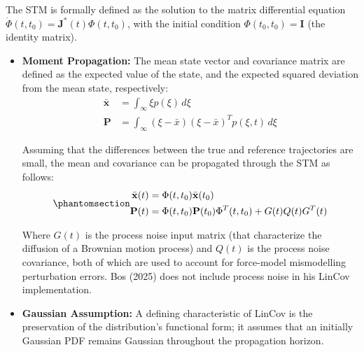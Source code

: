\documentclass[
  letterpaper,
  DIV=11,
  numbers=noendperiod,
  oneside]{scrartcl}
\begin{document}
\begin{tcolorbox}[enhanced jigsaw, arc=.35mm, bottomrule=.15mm, bottomtitle=1mm, breakable, colback=white, colbacktitle=quarto-callout-tip-color!10!white, colframe=quarto-callout-tip-color-frame, coltitle=black, left=2mm, leftrule=.75mm, opacityback=0, opacitybacktitle=0.6, rightrule=.15mm, title=\textcolor{quarto-callout-tip-color}{\faLightbulb}\hspace{0.5em}{State Transition Matrix (STM)}, titlerule=0mm, toprule=.15mm, toptitle=1mm]

The STM is formally defined as the solution to the matrix differential
equation \(\dot{\Phi}(t, t_0) = \mathbf{J}^*(t)\Phi(t, t_0)\), with the
initial condition \(\Phi(t_0, t_0) = \mathbf{I}\) (the identity matrix).

\end{tcolorbox}

\begin{itemize}
\item
  \textbf{Moment Propagation:} The mean state vector and covariance
  matrix are defined as the expected value of the state, and the
  expected squared deviation from the mean state, respectively: \[
  \begin{aligned}
  \bar{\mathbf{x}} &= \int_{\infty} \xi p(\xi)\,d\xi \\
  \mathbf{P} &= \int_{\infty} (\xi - \bar{x})(\xi - \bar{x})^T p(\xi,t)\,d\xi
  \end{aligned}
  \]

  Assuming that the differences between the true and reference
  trajectories are small, the mean and covariance can be propagated
  through the STM as follows:
  \begin{equation}\protect\phantomsection\label{eq-lincov-propagation}{
  \begin{aligned}
  \bar{\mathbf{x}}(t) &= \Phi(t, t_0)\bar{\mathbf{x}}(t_0) \\
  \mathbf{P}(t) &= \Phi(t, t_0)\mathbf{P}(t_0)\Phi^T(t, t_0) + G(t)Q(t)G^T(t)
  \end{aligned}
  }\end{equation}

  Where \(G(t)\) is the process noise input matrix (that characterize
  the diffusion of a Brownian motion process) and \(Q(t)\) is the
  process noise covariance, both of which are used to account for
  force-model mismodelling perturbation errors. Bos (2025) does not
  include process noise in his LinCov implementation.
\item
  \textbf{Gaussian Assumption:} A defining characteristic of LinCov is
  the preservation of the distribution's functional form; it assumes
  that an initially Gaussian PDF remains Gaussian throughout the
  propagation horizon.
\end{itemize}
\end{document}
